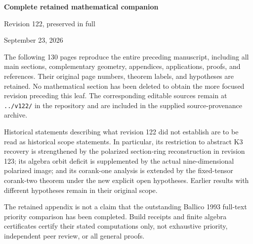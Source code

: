 \documentclass[11pt]{article}
\begin{document}

\clearpage
\thispagestyle{empty}
\vspace*{1in}
\begin{center}
{\Large\bfseries Complete retained mathematical companion}\par\bigskip
{\large Revision 122, preserved in full}\par\bigskip
September 23, 2026
\end{center}
\bigskip
The following 130 pages reproduce the entire preceding manuscript,
including all main sections, complementary geometry, appendices,
applications, proofs, and references. Their original page numbers,
theorem labels, and hypotheses are retained. No mathematical section
has been deleted to obtain the more focused revision preceding this
leaf. The corresponding editable sources remain at \texttt{../v122/}
in the repository and are included in the supplied source-provenance
archive.

\medskip
Historical statements describing what revision 122 did not establish
are to be read as historical scope statements. In particular, its
restriction to abstract K3 recovery is strengthened by the polarized
section-ring reconstruction in revision 123; its algebra orbit deficit
is supplemented by the actual nine-dimensional polarized image; and
its corank-one analysis is extended by the fixed-tensor corank-two
theorem under the new explicit open hypotheses. Earlier results with
different hypotheses remain in their original scope.

\medskip
The retained appendix is not a claim that the outstanding Ballico 1993
full-text priority comparison has been completed. Build receipts and
finite algebra certificates certify their stated computations only,
not exhaustive priority, independent peer review, or all general proofs.
\clearpage

\end{document}
